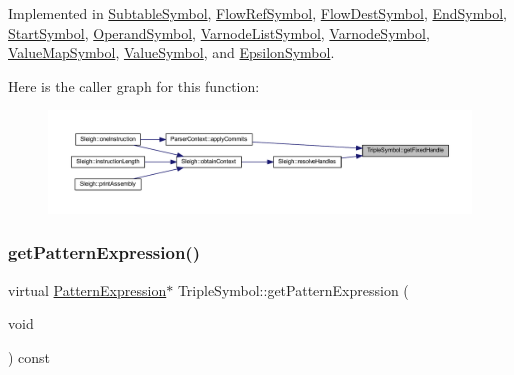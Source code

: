 Implemented in \mbox{\hyperlink{class_subtable_symbol_ac06bdc86f6d571f033657702b021bf92}{Subtable\+Symbol}}, \mbox{\hyperlink{class_flow_ref_symbol_af26eaa696c4a83005f982aa4bfa5a740}{Flow\+Ref\+Symbol}}, \mbox{\hyperlink{class_flow_dest_symbol_aac3ddb7a9bff23acbd59f3b44f477d10}{Flow\+Dest\+Symbol}}, \mbox{\hyperlink{class_end_symbol_a077a2986de808e3aec22ef7fe2dad5a8}{End\+Symbol}}, \mbox{\hyperlink{class_start_symbol_addda2db4266dfadb0158a6a305edff69}{Start\+Symbol}}, \mbox{\hyperlink{class_operand_symbol_a292e9cb914a17155467e7e1f0572021c}{Operand\+Symbol}}, \mbox{\hyperlink{class_varnode_list_symbol_aa4366d8c21b4969bff3cefde9893b25c}{Varnode\+List\+Symbol}}, \mbox{\hyperlink{class_varnode_symbol_a11a3571821d8d4092798d3cc62d925ee}{Varnode\+Symbol}}, \mbox{\hyperlink{class_value_map_symbol_a78aaab9818d7d20cbae621581b99894c}{Value\+Map\+Symbol}}, \mbox{\hyperlink{class_value_symbol_a8eeefeaf224149a7f81a301dc505a705}{Value\+Symbol}}, and \mbox{\hyperlink{class_epsilon_symbol_ae75ba4c46f54f5ee391f0a4ec8dd3933}{Epsilon\+Symbol}}.

Here is the caller graph for this function\+:
\nopagebreak
\begin{figure}[H]
\begin{center}
\leavevmode
\includegraphics[width=350pt]{class_triple_symbol_aa71f48c79a2bee73e97fdfb8163b4e46_icgraph}
\end{center}
\end{figure}
\mbox{\label{class_triple_symbol_a213895658c5fe547edf9ac54a1d2de2e}} 
\subsubsection{\texorpdfstring{getPatternExpression()}{getPatternExpression()}}
{\footnotesize\ttfamily virtual \mbox{\hyperlink{class_pattern_expression}{Pattern\+Expression}}$\ast$ Triple\+Symbol\+::get\+Pattern\+Expression (\begin{DoxyParamCaption}\item[{void}]{ }\end{DoxyParamCaption}) const\hspace{0.3cm}{\ttfamily [pure virtual]}}



